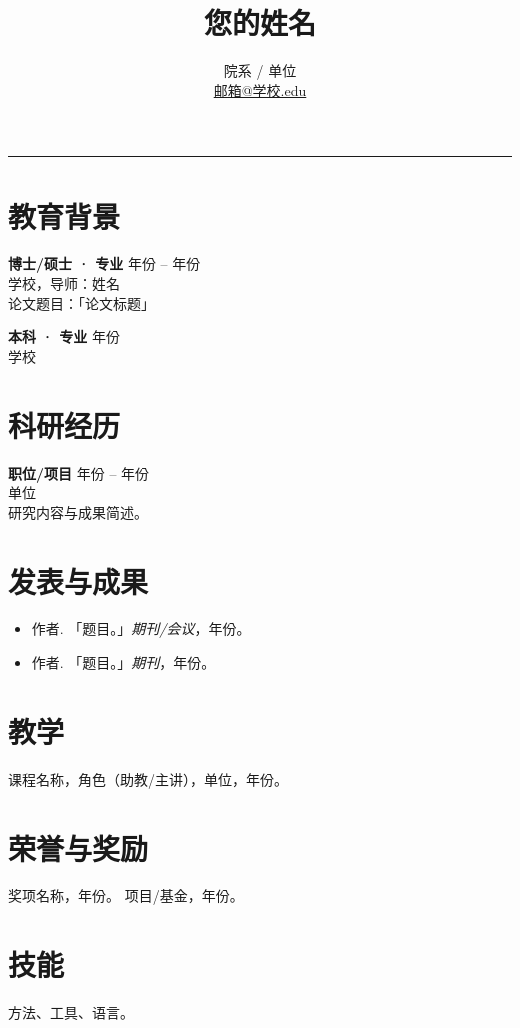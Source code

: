 \documentclass[11pt,a4paper]{article}
\title{\vspace{-1cm}\textbf{您的姓名}}
\author{院系 / 单位 \\ \href{mailto:邮箱@学校.edu}{邮箱@学校.edu}}
\date{}
\begin{document}
\maketitle
\vspace{-0.6cm}
\begin{flushright}\rule{2cm}{2.5cm}\end{flushright}
\section*{教育背景}
\textbf{博士/硕士 · 专业} \hfill 年份 -- 年份 \\
学校，导师：姓名 \\
论文题目：「论文标题」

\textbf{本科 · 专业} \hfill 年份 \\
学校

\section*{科研经历}
\textbf{职位/项目} \hfill 年份 -- 年份 \\
单位 \\
研究内容与成果简述。

\section*{发表与成果}
\begin{itemize}
  \item 作者. 「题目。」\textit{期刊/会议}，年份。
  \item 作者. 「题目。」\textit{期刊}，年份。
\end{itemize}

\section*{教学}
课程名称，角色（助教/主讲），单位，年份。

\section*{荣誉与奖励}
奖项名称，年份。 \quad 项目/基金，年份。

\section*{技能}
方法、工具、语言。
\end{document}
